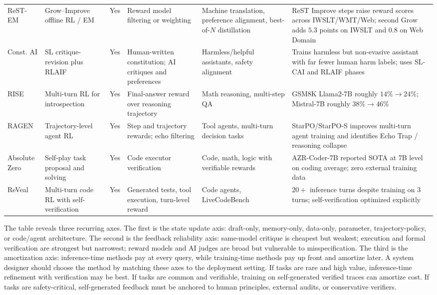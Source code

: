 {\begin{longtable}{@{}L{0.12\textwidth}L{0.14\textwidth}L{0.11\textwidth}L{0.17\textwidth}L{0.16\textwidth}L{0.22\textwidth}@{}}
ReST-EM & Grow--Improve offline RL / EM & Yes & Reward model filtering or weighting & Machine translation, preference alignment, best-of-$N$ distillation & ReST Improve steps raise reward scores across IWSLT/WMT/Web; second Grow adds $5.3$ points on IWSLT and $0.8$ on Web Domain \\
Const. AI \cite{bai2022constitutional} & SL critique-revision plus RLAIF & Yes & Human-written constitution; AI critiques and preferences & Harmless/helpful assistants, safety alignment & Trains harmless but non-evasive assistant with far fewer human harm labels; uses SL-CAI and RLAIF phases \\
RISE & Multi-turn RL for introspection & Yes & Final-answer reward over reasoning trajectory & Math reasoning, multi-step QA & GSM8K Llama2-7B roughly $14\%\rightarrow24\%$; Mistral-7B roughly $38\%\rightarrow46\%$ \\
RAGEN & Trajectory-level agent RL & Yes & Step and trajectory rewards; echo filtering & Tool agents, multi-turn decision tasks & StarPO/StarPO-S improves multi-turn agent training and identifies Echo Trap / reasoning collapse \\
Absolute Zero & Self-play task proposal and solving & Yes & Code executor verification & Code, math, logic with verifiable rewards & AZR-Coder-7B reported SOTA at 7B level on coding average; zero external training data \\
ReVeal & Multi-turn code RL with self-verification & Yes & Generated tests, tool execution, turn-level reward & Code agents, LiveCodeBench & $20+$ inference turns despite training on $3$ turns; self-verification optimized explicitly \\
\end{longtable}}

The table reveals three recurring axes. The first is the state update axis: draft-only, memory-only, data-only, parameter, trajectory-policy, or code/agent architecture. The second is the feedback reliability axis: same-model critique is cheapest but weakest; execution and formal verification are strongest but narrowest; reward models and AI judges are broad but vulnerable to misspecification. The third is the amortization axis: inference-time methods pay at every query, while training-time methods pay up front and amortize later. A system designer should choose the method by matching these axes to the deployment setting. If tasks are rare and high value, inference-time refinement with verification may be best. If tasks are common and verifiable, training on self-generated verified traces can amortize cost. If tasks are safety-critical, self-generated feedback must be anchored to human principles, external audits, or conservative verifiers.

